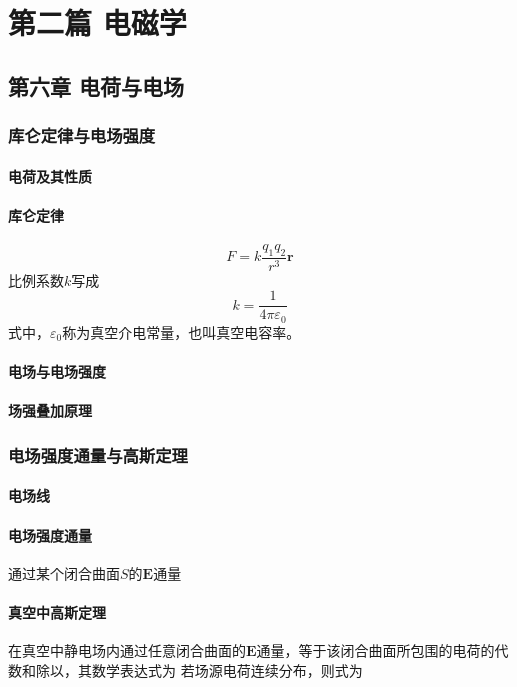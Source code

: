 \part{第二篇 电磁学}
\setcounter{chapter}{5}
\chapter{第六章 电荷与电场}

\section{库仑定律与电场强度}
    \subsection{电荷及其性质}
    \subsection{库仑定律}
    \[
    F=k\frac{q_1q_2}{r^3}\boldsymbol{r}
    \]
    比例系数$k$写成
    \[
    k=\frac{1}{4\pi\varepsilon_0}
    \]
    式中，$\varepsilon_0$称为真空介电常量，也叫真空电容率。
    \subsection{电场与电场强度}
    \subsection{场强叠加原理}

\section{电场强度通量与高斯定理}
    \subsection{电场线}
    \subsection{电场强度通量}
    通过某个闭合曲面$S$的$\boldsymbol{E}$通量
    \subsection{真空中高斯定理}
    在真空中静电场内通过任意闭合曲面的$\boldsymbol{E}$通量，等于该闭合曲面所包围的电荷的代数和除以，其数学表达式为
    若场源电荷连续分布，则式为
